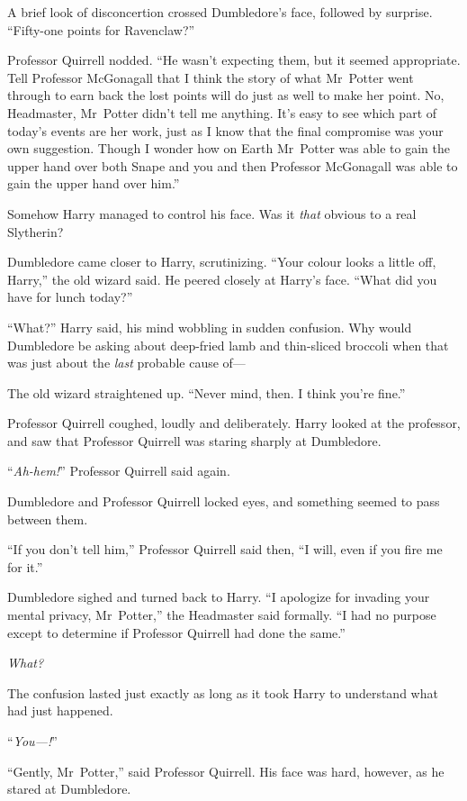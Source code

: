 A brief look of disconcertion crossed Dumbledore’s face, followed by surprise. “Fifty-one points for Ravenclaw?”

Professor Quirrell nodded. “He wasn’t expecting them, but it seemed appropriate. Tell Professor McGonagall that I think the story of what Mr~Potter went through to earn back the lost points will do just as well to make her point. No, Headmaster, Mr~Potter didn’t tell me anything. It’s easy to see which part of today’s events are her work, just as I know that the final compromise was your own suggestion. Though I wonder how on Earth Mr~Potter was able to gain the upper hand over both Snape and you and then Professor McGonagall was able to gain the upper hand over him.”

Somehow Harry managed to control his face. Was it \emph{that} obvious to a real Slytherin?

Dumbledore came closer to Harry, scrutinizing. “Your colour looks a little off, Harry,” the old wizard said. He peered closely at Harry’s face. “What did you have for lunch today?”

“What?” Harry said, his mind wobbling in sudden confusion. Why would Dumbledore be asking about deep-fried lamb and thin-sliced broccoli when that was just about the \emph{last} probable cause of—

The old wizard straightened up. “Never mind, then. I think you’re fine.”

Professor Quirrell coughed, loudly and deliberately. Harry looked at the professor, and saw that Professor Quirrell was staring sharply at Dumbledore.

“\emph{Ah-hem!}” Professor Quirrell said again.

Dumbledore and Professor Quirrell locked eyes, and something seemed to pass between them.

“If you don’t tell him,” Professor Quirrell said then, “I will, even if you fire me for it.”

Dumbledore sighed and turned back to Harry. “I apologize for invading your mental privacy, Mr~Potter,” the Headmaster said formally. “I had no purpose except to determine if Professor Quirrell had done the same.”

\emph{What?}

The confusion lasted just exactly as long as it took Harry to understand what had just happened.

“\emph{You—!}”

“Gently, Mr~Potter,” said Professor Quirrell. His face was hard, however, as he stared at Dumbledore.

